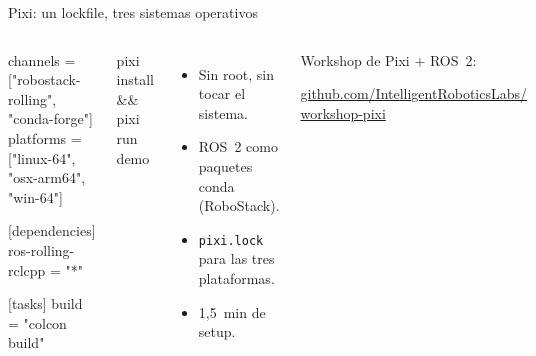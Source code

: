 \documentclass[aspectratio=169]{beamer}
\begin{document}
\begin{frame}[fragile]{Pixi: un lockfile, tres sistemas operativos}
\begin{columns}[T]
\begin{filelisting}
[workspace]
channels = ["robostack-rolling", "conda-forge"]
platforms = ["linux-64", "osx-arm64", "win-64"]

[dependencies]
ros-rolling-rclcpp = "*"

[tasks]
build = "colcon build"
\end{filelisting}
\begin{terminal}
pixi install && pixi run demo
\end{terminal}
\begin{itemize}
  \item Sin root, sin tocar el sistema.
  \item ROS~2 como paquetes conda (RoboStack).
  \item \lstinline|pixi.lock| para las tres plataformas.
  \item 1,5~min de setup.
\end{itemize}
\vspace{0.3em}
\begin{mensaje}
{\small Workshop de Pixi + ROS~2:}\\
{\scriptsize\ttfamily\href{https://github.com/IntelligentRoboticsLabs/workshop-pixi}{github.com/IntelligentRoboticsLabs/\\workshop-pixi}\par}
\end{mensaje}
\end{columns}
\end{frame}
\end{document}
